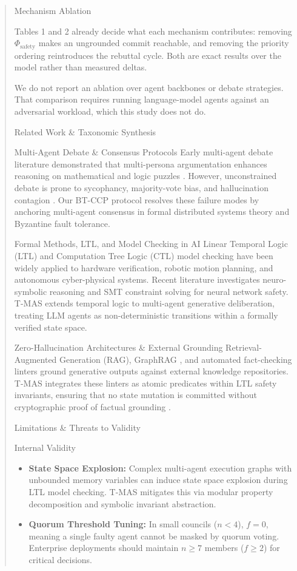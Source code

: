 \documentclass{article}
\begin{document}
\begin{quote}
{ Mechanism Ablation

Tables 1 and 2 already decide what each mechanism contributes: removing $\Phi_{\text{safety}}$ makes an ungrounded commit reachable, and removing the priority ordering reintroduces the rebuttal cycle. Both are exact results over the model rather than measured deltas.

We do not report an ablation over agent backbones or debate strategies. That comparison requires running language-model agents against an adversarial workload, which this study does not do.



 Related Work \& Taxonomic Synthesis

 Multi-Agent Debate \& Consensus Protocols
Early multi-agent debate literature demonstrated that multi-persona argumentation enhances reasoning on mathematical and logic puzzles \cite{arxiv_2005_14165,arxiv_2203_02155}. However, unconstrained debate is prone to sycophancy, majority-vote bias, and hallucination contagion \cite{arxiv_2406_00584}. Our BT-CCP protocol resolves these failure modes by anchoring multi-agent consensus in formal distributed systems theory and Byzantine fault tolerance.

 Formal Methods, LTL, and Model Checking in AI
Linear Temporal Logic (LTL) and Computation Tree Logic (CTL) model checking have been widely applied to hardware verification, robotic motion planning, and autonomous cyber-physical systems. Recent literature investigates neuro-symbolic reasoning and SMT constraint solving for neural network safety. T-MAS extends temporal logic to multi-agent generative deliberation, treating LLM agents as non-deterministic transitions within a formally verified state space.

 Zero-Hallucination Architectures \& External Grounding
Retrieval-Augmented Generation (RAG), GraphRAG \cite{arxiv_2501_14050}, and automated fact-checking linters ground generative outputs against external knowledge repositories. T-MAS integrates these linters as atomic predicates within LTL safety invariants, ensuring that no state mutation is committed without cryptographic proof of factual grounding \cite{arxiv_2405_01543,crossref_10_1201_9788743808145_14}.



 Limitations \& Threats to Validity

 Internal Validity
\begin{itemize}
  \item \textbf{State Space Explosion:} Complex multi-agent execution graphs with unbounded memory variables can induce state space explosion during LTL model checking. T-MAS mitigates this via modular property decomposition and symbolic invariant abstraction.
  \item \textbf{Quorum Threshold Tuning:} In small councils ($n < 4$), $f = 0$, meaning a single faulty agent cannot be masked by quorum voting. Enterprise deployments should maintain $n \ge 7$ members ($f \ge 2$) for critical decisions.
\end{itemize}

}
\end{quote}
\end{document}
